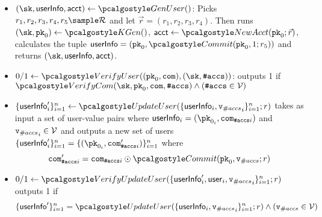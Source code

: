 \begin{itemize}
    \item $(\sk, \userinfo, \acct) \gets \genuser()$: Picks $r_1, r_2, r_3, r_4, r_5 \sample \randspace$ and let $\vec{r} = (r_1, r_2, r_3, r_4)$. Then runs $(\sk, \inpk)\gets \kgen()$, $\acct \gets \newacc(\inpk; \vec{r})$, calculates the tuple $\userinfo = (\inpk, \commit(\inpk, 1;r_5))$  and returns
    $(\sk, \userinfo, \acct)$.
    
    \item  $0/1 \gets \veruser((\inpk, \com), (\sk, \numaccs))$: outputs 1  if \\ 
   $
        \vercom(\sk, \inpk, \com, \numaccs)
        \land (\numaccs \in \vset)
    $

    \item $\{\userinfo'_i\}_{i=1}^n \gets \upduser(\{\userinfo_i, {\vnumaccs}_i\}_{i=1}^n; r)$ takes as input a set of user-value pairs where $\userinfo_i = (\pk_{0_i},\com_{\numaccs i})$ and ${\textup{\texttt{{v}}}_{\#accs}}_i \in \mathcal{V}$ and outputs a new set of users $\{\userinfo'_{i}\}_{i=1}^n = \{(\pk_{0_i}, \com_{\numaccs i}^\prime)\}_{i=1}^n$ 
    where 
    \begin{equation*}
        \com_{\numaccs i}^\prime = \com_{\numaccs i} \odot \commit(\inpk, \vnumaccs;r)
    \end{equation*}

    \item $0/1 \gets \verupduser(\{\userinfo'_i, \user_i, {\vnumaccs}_i\}_{i=1}^n; r)$ outputs 1 if
    \begin{equation*}
        \{\userinfo'\}_{i=1}^n = \upduser(\{\userinfo_i, {\vnumaccs}_i\}_{i=1}^n; r) \land (\vnumaccs \in \vset)
    \end{equation*}
\end{itemize}